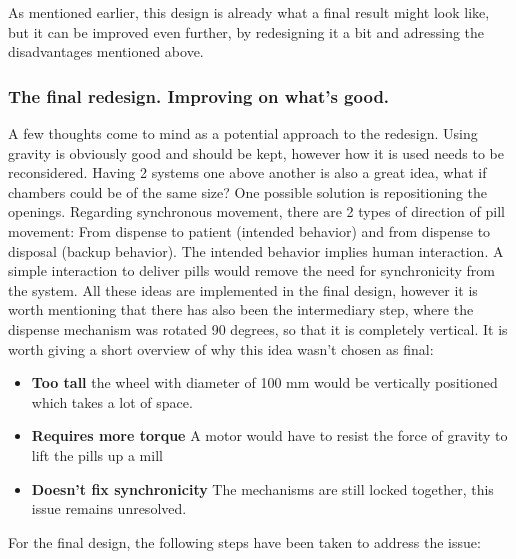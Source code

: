 As mentioned earlier, this design is already what a final result might look like, but it can be improved even further, by redesigning it a bit and adressing the disadvantages mentioned above.
\newpage

\subsubsection{The final redesign. Improving on what's good.}
A few thoughts come to mind as a potential approach to the redesign. Using gravity is obviously good and should be kept, however how it is used needs to be reconsidered. Having 2 systems one above another is also a great idea, what if chambers could be of the same size? One possible solution is repositioning the openings. Regarding synchronous movement, there are 2 types of direction of pill movement: From dispense to patient (intended behavior) and from dispense to disposal (backup behavior). The intended behavior implies human interaction. A simple interaction to deliver pills would remove the need for synchronicity from the system. All these ideas are implemented in the final design, however it is worth mentioning that there has also been the intermediary step, where the dispense mechanism was rotated 90 degrees, so that it is completely vertical. It is worth giving a short overview of why this idea wasn't chosen as final:
\begin{itemize}
	\item{\textbf{Too tall}} the wheel with diameter of 100 mm would be vertically positioned which takes a lot of space.
	\item{\textbf{Requires more torque}} A motor would have to resist the force of gravity to lift the pills up a mill
	\item{\textbf{Doesn't fix synchronicity}} The mechanisms are still locked together, this issue remains unresolved.
\end{itemize}
\newpage
For the final design, the following steps have been taken to address the issue:
